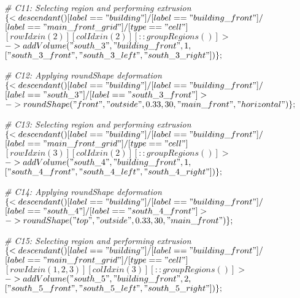 \noindent \textit{\# C11: Selecting region and performing extrusion}\\
$\{< descendant() [label=="building"] / [label=="building\_front"] / $\\
$[label=="main\_front\_grid"] / [type=="cell"] $\\
$[rowIdx in (2)] [colIdx in (2)] [::groupRegions()] > $\\
$-> addVolume("south\_3", "building\_front", 1, $\\
$["south\_3\_front", "south\_3\_left", "south\_3\_right"])\};$

\noindent \textit{\# C12: Applying roundShape deformation}\\
$\{< descendant() [label=="building"] / [label=="building\_front"] / $\\
$[label=="south\_3"] / [label=="south\_3\_front"] > $\\
$-> roundShape("front", "outside", 0.33, 30, "main\_front", "horizontal")\};$

\noindent \textit{\# C13: Selecting region and performing extrusion}\\
$\{< descendant() [label=="building"] / [label=="building\_front"] / $\\
$[label=="main\_front\_grid"] / [type=="cell"] $\\
$[rowIdx in (3)] [colIdx in (2)] [::groupRegions()] > $\\
$-> addVolume("south\_4", "building\_front", 1, $\\
$["south\_4\_front", "south\_4\_left", "south\_4\_right"])\};$

\noindent \textit{\# C14: Applying roundShape deformation}\\
$\{< descendant() [label=="building"] / [label=="building\_front"] / $\\
$[label=="south\_4"] / [label=="south\_4\_front"] > $\\
$-> roundShape("top", "outside", 0.33, 30, "main\_front")\};$

\noindent \textit{\# C15: Selecting region and performing extrusion}\\
$\{< descendant() [label=="building"] / [label=="building\_front"] / $\\
$[label=="main\_front\_grid"] / [type=="cell"] $\\
$[rowIdx in (1, 2, 3)] [colIdx in (3)] [::groupRegions()] > $\\
$-> addVolume("south\_5", "building\_front", 2, $\\
$["south\_5\_front", "south\_5\_left", "south\_5\_right"])\};$

